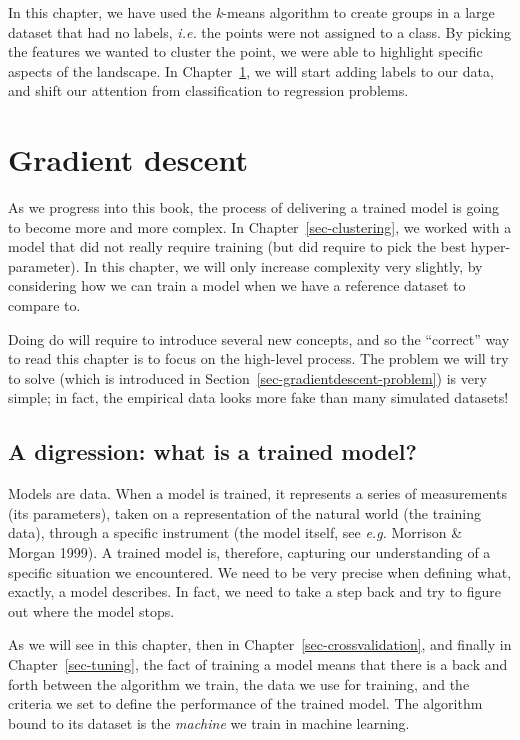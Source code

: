 \documentclass[
  letterpaper,
]{scrbook}
\begin{document}
In this chapter, we have used the \emph{k}-means algorithm to create
groups in a large dataset that had no labels, \emph{i.e.} the points
were not assigned to a class. By picking the features we wanted to
cluster the point, we were able to highlight specific aspects of the
landscape. In Chapter~\ref{sec-gradientdescent}, we will start adding
labels to our data, and shift our attention from classification to
regression problems.


\chapter{Gradient descent}\label{sec-gradientdescent}

As we progress into this book, the process of delivering a trained model
is going to become more and more complex. In
Chapter~\ref{sec-clustering}, we worked with a model that did not really
require training (but did require to pick the best hyper-parameter). In
this chapter, we will only increase complexity very slightly, by
considering how we can train a model when we have a reference dataset to
compare to.

Doing do will require to introduce several new concepts, and so the
``correct'' way to read this chapter is to focus on the high-level
process. The problem we will try to solve (which is introduced in
Section~\ref{sec-gradientdescent-problem}) is very simple; in fact, the
empirical data looks more fake than many simulated datasets!

\section{A digression: what is a trained
model?}\label{sec-gradientdescent-trainedmodel}

Models are data. When a model is trained, it represents a series of
measurements (its parameters), taken on a representation of the natural
world (the training data), through a specific instrument (the model
itself, see \emph{e.g.} Morrison \& Morgan 1999). A trained model is,
therefore, capturing our understanding of a specific situation we
encountered. We need to be very precise when defining what, exactly, a
model describes. In fact, we need to take a step back and try to figure
out where the model stops.

As we will see in this chapter, then in
Chapter~\ref{sec-crossvalidation}, and finally in
Chapter~\ref{sec-tuning}, the fact of training a model means that there
is a back and forth between the algorithm we train, the data we use for
training, and the criteria we set to define the performance of the
trained model. The algorithm bound to its dataset is the \emph{machine}
we train in machine learning.
\end{document}
